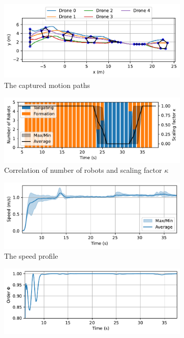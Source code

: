 \begin{figure}
    \centering
    \begin{subfigure}[b]{0.48\textwidth}
    \includegraphics[width=\textwidth]{paper3/images/gazebo_path.pdf}
    \caption{The captured motion paths}
    \label{fig:gazebo_path}
    \end{subfigure}
    \begin{subfigure}[b]{0.48\textwidth}
    \includegraphics[width=\textwidth]{paper3/images/gazebo_correlation.pdf}
    \caption{Correlation of number of robots and scaling factor $\kappa$}
    \label{fig:gazebo_mode}
    \end{subfigure}
    \begin{subfigure}[b]{0.48\textwidth}
    \includegraphics[width=\textwidth]{paper3/images/gazebo_speed.pdf}
    \caption{The speed profile}
    \label{fig:gazebo_speed}
    \end{subfigure}
    \begin{subfigure}[b]{0.48\textwidth}
    \includegraphics[width=\textwidth]{paper3/images/gazebo_order.pdf}

\end{subfigure}
\end{figure}
